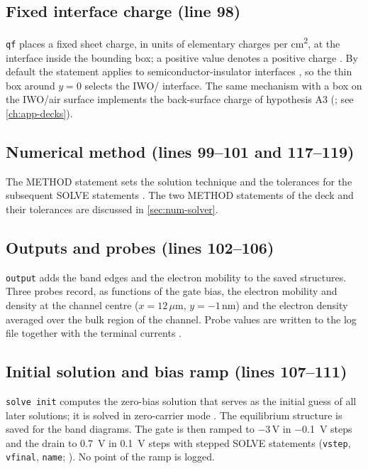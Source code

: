 \subsection{Fixed interface charge (line 98)}

\texttt{qf} places a fixed sheet charge, in units of elementary charges per \si{cm^2}, at the interface inside the
bounding box; a positive value denotes a positive charge \citep[p.~1260]{AtlasManual}. By default the statement applies
to semiconductor-insulator interfaces \citep[p.~1264]{AtlasManual}, so the thin box around $y = 0$ selects the
IWO/\AlO{} interface. The same mechanism with a box on the IWO/air surface implements the back-surface charge of
hypothesis A3 (; see \cref{ch:app-decks}).

\subsection{Numerical method (lines 99--101 and 117--119)}

The METHOD statement sets the solution technique and the tolerances for the subsequent SOLVE statements
\citep[p.~1384]{AtlasManual}. The two METHOD statements of the deck and their tolerances are discussed in
\cref{sec:num-solver}.

\subsection{Outputs and probes (lines 102--106)}

\texttt{output} adds the band edges and the electron mobility to the saved structures. Three probes record, as functions
of the gate bias, the electron mobility and density at the channel centre ($x = 12\,\mu$m, $y = -1$\,nm) and the
electron density averaged over the bulk region of the channel. Probe values are written to the log file together with
the terminal currents \citep[p.~1299]{AtlasManual}.

\subsection{Initial solution and bias ramp (lines 107--111)}

\texttt{solve init} computes the zero-bias solution that serves as the initial guess of all later solutions; it is
solved in zero-carrier mode \citep[p.~1598]{AtlasManual}. The equilibrium structure is saved for the band diagrams. The
gate is then ramped to $-3$\,V in \SI{-0.1}{V} steps and the drain to \SI{0.7}{V} in \SI{0.1}{V} steps with stepped
SOLVE statements (\texttt{vstep}, \texttt{vfinal}, \texttt{name}; \citep[pp.~1593, 1609]{AtlasManual}). No point of
the ramp is logged.


